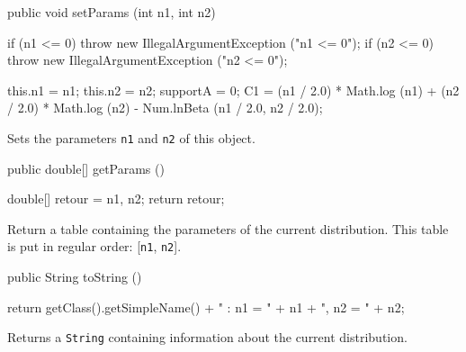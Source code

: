 \begin{code}

   public void setParams (int n1, int n2)\begin{hide} {
      if (n1 <= 0)
         throw new IllegalArgumentException ("n1 <= 0");
      if (n2 <= 0)
         throw new IllegalArgumentException ("n2 <= 0");

      this.n1 = n1;
      this.n2 = n2;
      supportA = 0;
      C1 = (n1 / 2.0) * Math.log (n1) + (n2 / 2.0) * Math.log (n2) -
           Num.lnBeta (n1 / 2.0, n2 / 2.0);
   }\end{hide}
\end{code}
\begin{tabb}
   Sets the parameters \texttt{n1} and \texttt{n2} of this object.
\end{tabb}
\begin{code}

   public double[] getParams ()\begin{hide} {
      double[] retour = {n1, n2};
      return retour;
   }\end{hide}
\end{code}
\begin{tabb}
   Return a table containing the parameters of the current distribution.
   This table is put in regular order: [\texttt{n1}, \texttt{n2}].
\end{tabb}
\begin{hide}\begin{code}

   public String toString ()\begin{hide} {
      return getClass().getSimpleName() + " : n1 = " + n1 + ", n2 = " + n2;
   }\end{hide}
\end{code}
\begin{tabb}
   Returns a \texttt{String} containing information about the current distribution.
\end{tabb}\end{hide}
\begin{code}\begin{hide}
}\end{hide}
\end{code}
